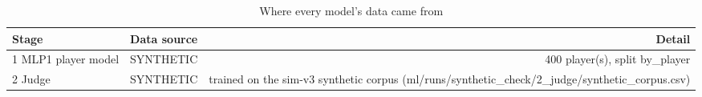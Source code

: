 \begin{table}[ht]
\centering
\small
\begin{tabular}{lrr}
\toprule
Stage & Data source & Detail \\
\midrule
1 MLP1 player model & SYNTHETIC & 400 player(s), split by\_player \\
2 Judge & SYNTHETIC & trained on the sim-v3 synthetic corpus (ml/runs/synthetic\_check/2\_judge/synthetic\_corpus.csv) \\
\bottomrule
\end{tabular}
\caption{Where every model's data came from}
\label{tab:data_sources}
\end{table}
